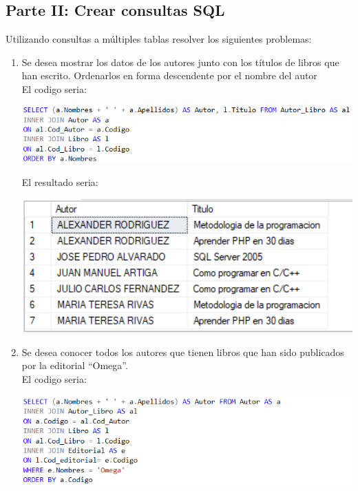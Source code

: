 \documentclass{article}
\begin{document}
    \subsection{Parte II: Crear consultas SQL}
    Utilizando consultas a múltiples tablas resolver los siguientes problemas:
    \begin{enumerate}[\tab 1.]
        \item Se desea mostrar los datos de los autores junto con los títulos de libros que han escrito. Ordenarlos en forma descendente por el nombre del autor\\[0.1in]
        El codigo seria:
        \begin{center}
            \includegraphics[width=13cm]{./images/7.1.png}
        \end{center}
        El resultado seria:
        \begin{center}
            \includegraphics[width=13cm]{./images/7.2.png}
        \end{center}
        \item Se desea conocer todos los autores que tienen libros que han sido publicados por la editorial “Omega”.\\[0.1in]
        El codigo seria:
        \begin{center}
            \includegraphics[width=13cm]{./images/8.1.png}
        \end{center}

\end{enumerate}
\end{document}
